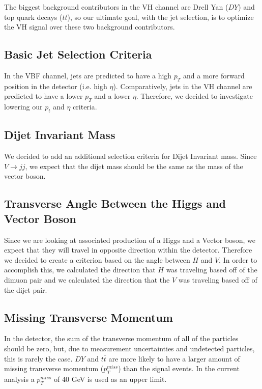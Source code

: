 \documentclass[12pt]{article}
\begin{document}
The biggest background contributors in the VH channel are Drell Yan ($DY$) and top quark decays ($t\overline{t}$), 
so our ultimate goal, with the jet selection, is to optimize the VH signal over these two background contributors.

\subsection{Basic Jet Selection Criteria}

In the VBF channel, jets are predicted to have a high $p_{T}$ and a more forward position in the detector (i.e. high $\eta$). 
Comparatively, jets in the VH channel are predicted to have a lower $p_{T}$ and a lower $\eta$. 
Therefore, we decided to investigate lowering our $p_{t}$ and $\eta$ criteria.

\subsection{Dijet Invariant Mass}

We decided to add an additional selection criteria for Dijet Invariant mass. 
Since $V \rightarrow jj$, we expect that the dijet mass should be the same as the mass of the vector boson.

\subsection{Transverse Angle Between the Higgs and Vector Boson}

Since we are looking at associated production of a Higgs and a Vector boson, we expect that they will travel in opposite direction within the detector. 
Therefore we decided to create a criterion based on the angle between $H$ and $V$. 
In order to accomplish this, we calculated the direction that $H$ was traveling based off of the dimuon pair 
and we calculated the direction that the $V$ was traveling based off of the dijet pair. 

\subsection{Missing Transverse Momentum}

In the detector, the sum of the transverse momentum of all of the particles should be zero, 
but, due to measurement uncertainties and undetected particles, this is rarely the case. 
$DY$ and $t\overline{t}$ are more likely to have a larger amount of missing transverse momentum ($p_{T}^{miss}$) than the signal events. 
In the current analysis a $p_{T}^{miss}$ of 40 GeV is used as an upper limit.
\end{document}
